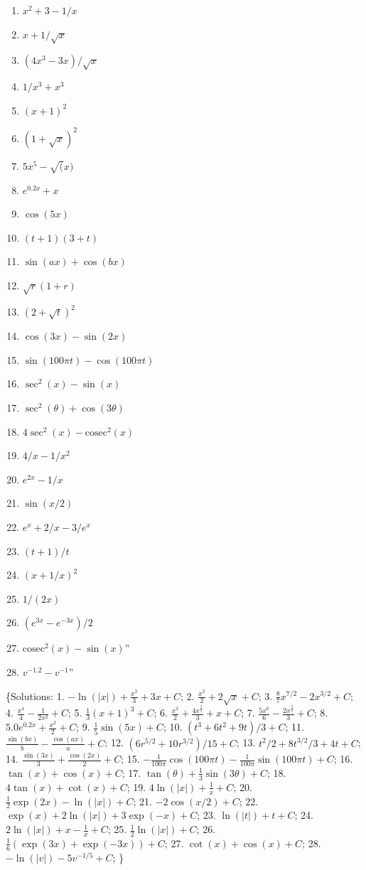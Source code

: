 \documentclass[
  english,
  11pt,
  oneside]{book}
\providecommand{\tightlist}{%
  \setlength{\itemsep}{0pt}\setlength{\parskip}{0pt}}
\theoremstyle{definition}
\theoremstyle{definition}
\theoremstyle{definition}
\theoremstyle{definition}
\theoremstyle{remark}
\begin{document}
\begin{enumerate}
\def\labelenumi{\arabic{enumi}.}
\tightlist
\item
  \(x^2+3-1/x\)
\item
  \(x+1/\sqrt{x}\)
\item
  \((4x^3-3x)/\sqrt{x}\)
\item
  \(1/x^3+x^3\)
\item
  \((x+1)^2\)
\item
  \((1+\sqrt{x})^2\)
\item
  \(5x^5-\sqrt(x)\)
\item
  \(e^{0.2x}+x\)
\item
  \(\cos(5x)\)
\item
  \((t+1)(3+t)\)
\item
  \(\sin(ax)+\cos(bx)\)
\item
  \(\sqrt{r}(1+r)\)
\item
  \((2+\sqrt{t})^2\)
\item
  \(\cos(3x)-\sin(2x)\)
\item
  \(\sin(100\pi t)-\cos(100\pi t)\)
\item
  \(\sec^2(x)-\sin(x)\)
\item
  \(\sec^2(\theta)+\cos(3\theta)\)
\item
  \(4\sec^2(x)-\text{cosec}^2(x)\)
\item
  \(4/x-1/x^2\)
\item
  \(e^{2x}-1/x\)
\item
  \(\sin(x/2)\)
\item
  \(e^x+2/x-3/e^x\)
\item
  \((t+1)/t\)
\item
  \((x+1/x)^2\)
\item
  \(1/(2x)\)
\item
  \((e^{3x}-e^{-3x})/2\)
\item
  \(\text{cosec}^2(x)-\sin(x)\)''
\item
  \(v^{-1.2}-v^{-1}\)''
\end{enumerate}

\{Solutions:
1. \(-\ln(|x|)+{\frac{x^3}{3}}+3x+C\);
2. \({\frac{x^2}{2}}+2\sqrt{x}+C\);
3. \(\frac{8}{7}x^{7/2} - 2x^{3/2}+C\);
4. \({\frac{x^4}{4}}-{\frac{1}{2x^2}}+C\);
5. \(\frac{1}{3}(x+1)^3+C\);
6. \({\frac{x^2}{2}}+\frac{4x^{\frac{3}{2}}}{3}+x+C\);
7. \({\frac{5x^6}{6}}-\frac{2x^{\frac{3}{2}}}{3}+C\);
8. \(5.0e^{0.2x}+\frac{x^2}{2}+C\);
9. \(\frac{1}{5}\sin(5x)+C\);
10. \((t^3+6t^2+9t)/3+C\);
11. \(\frac{\sin(bx)}{b}-\frac{\cos(ax)}{a}+C\);
12. \((6r^{5/2}+10r^{3/2})/15+C\);
13. \(t^2/2 + 8t^{3/2}/3+4t+C\);
14. \(\frac{\sin(3x)}{3}+\frac{\cos(2x)}{2}+C\);
15. \(-\frac{1}{100\pi}\cos(100\pi t) - \frac{1}{100\pi}\sin(100\pi t) + C\);
16. \(\tan(x)+\cos(x)+C\);
17. \(\tan(\theta) + \frac{1}{3}\sin(3\theta)+C\);
18. \(4\tan(x) + \cot(x) +C\);
19. \(4\ln(|x|) + \frac{1}{x} +C\);
20. \(\frac{1}{2}\exp(2x)-\ln(|x|) + C\);
21. \(-2\cos(x/2)+C\);
22. \(\exp(x) + 2\ln(|x|) +3\exp(-x)+C\);
23. \(\ln(|t|) + t + C\);
24. \(2\ln(|x|) + x - \frac{1}{x} + C\);
25. \(\frac{1}{2}\ln(|x|)+C\);
26. \(\frac{1}{6}(\exp(3x)+\exp(-3x)) + C\);
27. \(\cot(x)+\cos(x)+C\);
28. \(-\ln(|v|)-5 v^{-1/5}+C\);
\}
\end{document}
